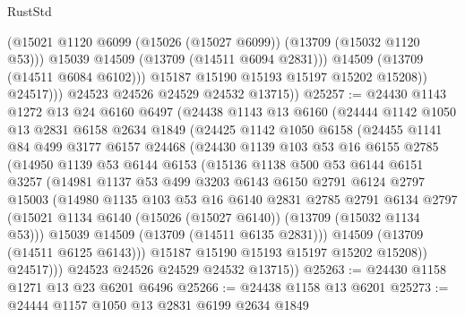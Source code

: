 \begin{lexlean}{RustStd}
\begin{coremodule}
                      (@15021 @1120 @6099 (@15026 (@15027 @6099)) (@13709 (@15032 @1120 @53)))
                      @15039
                      @14509
                      (@13709 (@14511 @6094 @2831)))
                    @14509
                    (@13709 (@14511 @6084 @6102)))
                  @15187
                  @15190
                  @15193
                  @15197
                  @15202
                  @15208))
              @24517)))
        @24523
        @24526
        @24529
        @24532
        @13715))
@25257 := @24430
    @1143
    @1272
    @13
    @24
    @6160
    @6497
    (@24438
      @1143
      @13
      @6160
      (@24444
        @1142
        @1050
        @13
        @2831
        @6158
        @2634
        @1849
        (@24425
          @1142
          @1050
          @6158
          (@24455
            @1141
            @84
            @499
            @3177
            @6157
            @24468
            (@24430
              @1139
              @103
              @53
              @16
              @6155
              @2785
              (@14950
                @1139
                @53
                @6144
                @6153
                (@15136
                  @1138
                  @500
                  @53
                  @6144
                  @6151
                  @3257
                  (@14981
                    @1137
                    @53
                    @499
                    @3203
                    @6143
                    @6150
                    @2791
                    @6124
                    @2797
                    @15003
                    (@14980
                      @1135
                      @103
                      @53
                      @16
                      @6140
                      @2831
                      @2785
                      @2791
                      @6134
                      @2797
                      (@15021 @1134 @6140 (@15026 (@15027 @6140)) (@13709 (@15032 @1134 @53)))
                      @15039
                      @14509
                      (@13709 (@14511 @6135 @2831)))
                    @14509
                    (@13709 (@14511 @6125 @6143)))
                  @15187
                  @15190
                  @15193
                  @15197
                  @15202
                  @15208))
              @24517)))
        @24523
        @24526
        @24529
        @24532
        @13715))
@25263 := @24430 @1158 @1271 @13 @23 @6201 @6496
@25266 := @24438 @1158 @13 @6201
@25273 := @24444 @1157 @1050 @13 @2831 @6199 @2634 @1849

\end{coremodule}
\end{lexlean}
